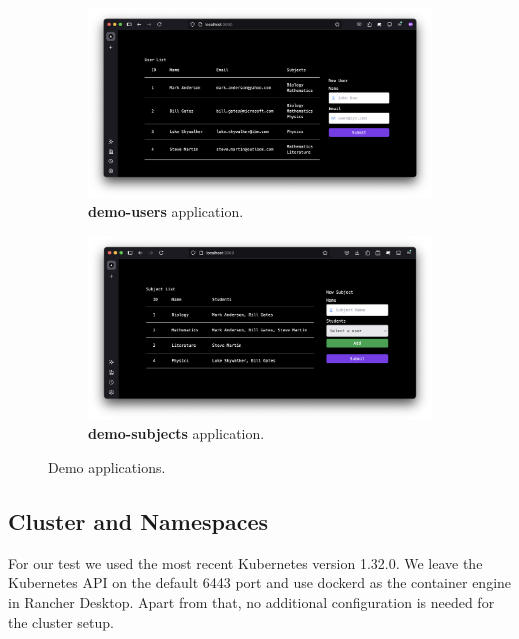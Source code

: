 \begin{figure}[!hbt]
	\centering
  \begin{subfigure}[b]{0.45\textwidth}
		\includegraphics[width=1.1\linewidth]{images/demo-users.png}
        \caption{\textbf{demo-users} application.}
		\label{img:demo-users}
  \end{subfigure}
  \hfill
  \begin{subfigure}[b]{0.45\textwidth}
		\includegraphics[width=1.1\linewidth]{images/demo-subjects.png}
        \caption{\textbf{demo-subjects} application.}
		\label{img:demo-subjects}
  \end{subfigure}
  \caption{Demo applications.}
  \label{img:demo-apps}
\end{figure}

\subsection{Cluster and Namespaces}

For our test we used the most recent Kubernetes version 1.32.0. We leave the Kubernetes API on the default 6443 port and use dockerd as the container engine in Rancher Desktop. Apart from that, no additional configuration is needed for the cluster setup.

